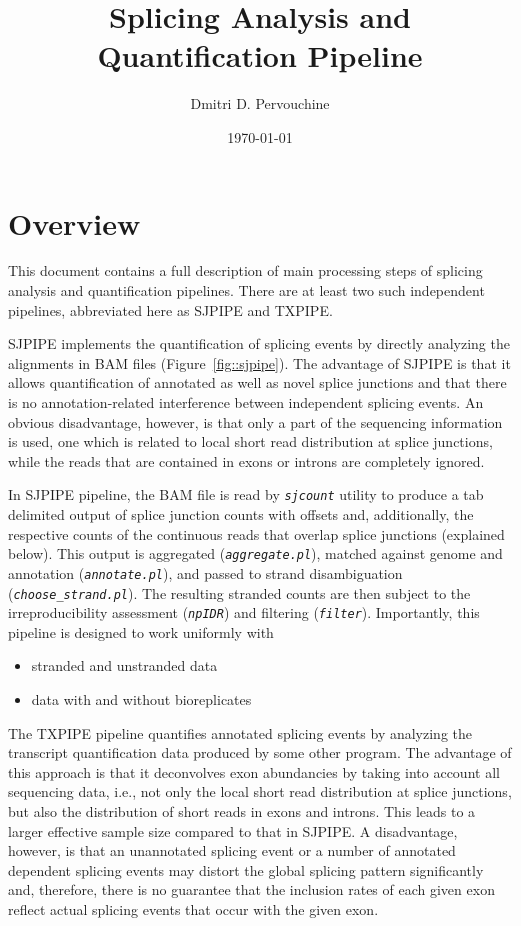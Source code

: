 \documentclass{article}
\newcommand{\prog}[1]{{\tt\em #1}}
\begin{document}
\title{Splicing Analysis and Quantification Pipeline}
\author{Dmitri D. Pervouchine}
\date{\today}
\maketitle


\tableofcontents

\section{Overview}
This document contains a full description of main processing steps of splicing analysis and quantification pipelines. 
There are at least two such independent pipelines, abbreviated here as SJPIPE and TXPIPE. 

SJPIPE implements the quantification of splicing events by directly analyzing the alignments in BAM files 
(Figure~\ref{fig::sjpipe}). The advantage of SJPIPE is that it allows quantification of annotated as well as 
novel splice junctions and that there is no annotation-related interference between independent splicing events. 
An obvious disadvantage, however, is that only a part of the sequencing information is used, one which is related 
to local short read distribution at splice junctions, while the reads that are contained in exons or introns are 
completely ignored.

In SJPIPE pipeline, the BAM file is read by \prog{sjcount} utility to produce a tab delimited output of splice junction 
counts with offsets and, additionally, the respective counts of the continuous reads that overlap splice junctions 
(explained below). This output is aggregated (\prog{aggregate.pl}), matched against genome and annotation (\prog{annotate.pl}), 
and passed to strand disambiguation (\prog{choose\_strand.pl}). The resulting stranded counts are then subject to the 
irreproducibility assessment (\prog{npIDR}) and filtering (\prog{filter}). Importantly, this pipeline is designed to 
work uniformly with
\begin{itemize}
\item stranded and unstranded data
\item data with and without bioreplicates
\end{itemize}

The TXPIPE pipeline quantifies annotated splicing events by analyzing the transcript quantification data produced by some 
other program. The advantage of this approach is that it deconvolves exon abundancies by taking into account all sequencing 
data, i.e., not only the local short read distribution at splice junctions, but also the distribution of short reads in exons 
and introns. This leads to a larger effective sample size compared to that in SJPIPE. A disadvantage, however, is that an 
unannotated splicing event or a number of annotated dependent splicing events may distort the global splicing pattern significantly 
and, therefore, there is no guarantee that the inclusion rates of each given exon reflect actual splicing events that occur 
with the given exon.
\end{document}
